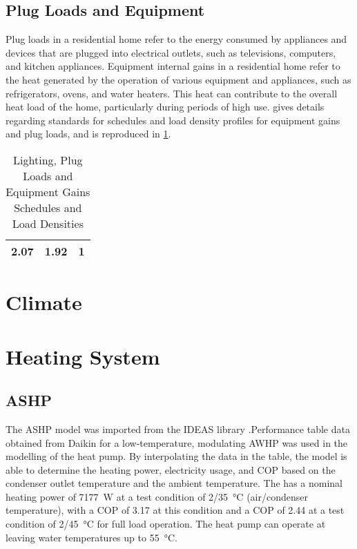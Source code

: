 \subsection{Plug Loads and Equipment}
Plug loads in a residential home refer to the energy consumed by appliances and devices that are plugged into electrical outlets, such as televisions, computers, and kitchen appliances. Equipment internal gains in a residential home refer to the heat generated by the operation of various equipment and appliances, such as refrigerators, ovens, and water heaters. This heat can contribute to the overall heat load of the home, particularly during periods of high use.  gives details regarding standards for schedules and load density profiles for equipment gains and plug loads, and is reproduced in \cref{tbl:lightandequip}.

\begin{table}[htb]
    \centering
    \caption{Lighting, Plug Loads and Equipment Gains Schedules and Load Densities \cite{ISO17772}}
    \label{tbl:lightandequip}
    \begin{tabular}
        {lcr}
        \toprule
        2.07&1.92   &1\\
        \bottomrule
    \end{tabular}
\end{table}

\section{Climate}

\section{Heating System}
\subsection{ASHP}
The \ac{ASHP} model was imported from the IDEAS library \cite{jorissen_implementation_2018}.Performance table data obtained from Daikin for a low-temperature, modulating \ac{AWHP} was used in the modelling of the heat pump. By interpolating the data in the table, the model is able to determine the heating power, electricity usage, and \ac{COP} based on the condenser outlet temperature and the ambient temperature. The \HP has a nominal heating power of \qty{7177}{\watt} at a test condition of 2/\qty{35}{\celsius} (air/condenser temperature), with a \ac{COP} of 3.17 at this condition and a \ac{COP} of 2.44 at a test condition of 2/\qty{45}{\celsius} for full load operation. The heat pump can operate at leaving water temperatures up to \qty{55}{\celsius}.

